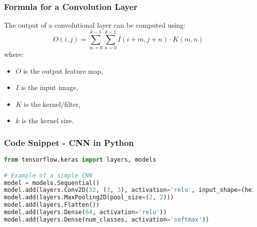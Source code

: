 \documentclass[aspectratio=169]{beamer}
\begin{document}
\begin{frame}[fragile]
    \frametitle{Formula for a Convolution Layer}
    The output of a convolutional layer can be computed using:
    \begin{equation}
        O(i, j) = \sum_{m=0}^{k-1} \sum_{n=0}^{k-1} I(i+m, j+n) \cdot K(m, n)
    \end{equation}
    where:
    \begin{itemize}
        \item \(O\) is the output feature map,
        \item \(I\) is the input image,
        \item \(K\) is the kernel/filter,
        \item \(k\) is the kernel size.
    \end{itemize}
\end{frame}

\begin{frame}[fragile]
    \frametitle{Code Snippet - CNN in Python}
    \begin{lstlisting}[language=Python]
from tensorflow.keras import layers, models

# Example of a simple CNN
model = models.Sequential()
model.add(layers.Conv2D(32, (3, 3), activation='relu', input_shape=(height, width, channels)))
model.add(layers.MaxPooling2D(pool_size=(2, 2)))
model.add(layers.Flatten())
model.add(layers.Dense(64, activation='relu'))
model.add(layers.Dense(num_classes, activation='softmax'))
    \end{lstlisting}
\end{frame}
\end{document}
